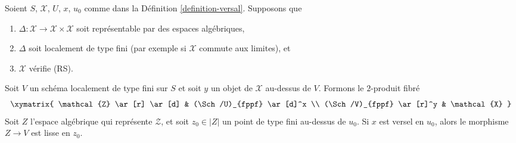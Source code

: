 \begin{lemma}
\label{lemma-base-change-versal}
Soient $S$, $\mathcal{X}$, $U$, $x$, $u_0$ comme dans la
Définition \ref{definition-versal}. Supposons que
\begin{enumerate}
\item $\Delta : \mathcal{X} \to \mathcal{X} \times \mathcal{X}$
soit représentable par des espaces algébriques,
\item $\Delta$ soit localement de type fini
(par exemple si $\mathcal{X}$ commute aux limites), et
\item $\mathcal{X}$ vérifie (RS).
\end{enumerate}
Soit $V$ un schéma localement de type fini sur $S$
et soit $y$ un objet de $\mathcal{X}$ au-dessus de $V$.
Formons le $2$-produit fibré
$$
\xymatrix{
\mathcal{Z} \ar[r] \ar[d] & (\Sch/U)_{fppf} \ar[d]^x \\
(\Sch/V)_{fppf} \ar[r]^y & \mathcal{X}
}
$$
Soit $Z$ l'espace algébrique qui représente $\mathcal{Z}$,
et soit $z_0 \in |Z|$ un point de type fini au-dessus de $u_0$.
Si $x$ est versel en $u_0$, alors
le morphisme $Z \to V$ est lisse en $z_0$.
\end{lemma}

